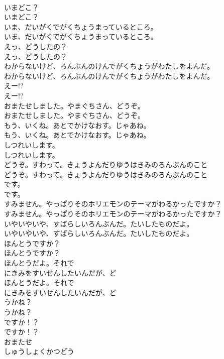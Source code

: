 \documentclass[8pt]{extreport}
\begin{document}
\begin{CJK}{UTF8}{min}
\\	いまどこ？
\\	いまどこ？
\\	いま、だいがくでがくちょうまっているところ。
\\	いま、だいがくでがくちょうまっているところ。
\\	えっ、どうしたの？
\\	えっ、どうしたの？
\\	わからないけど、ろんぶんのけんでがくちょうがわたしをよんだ。
\\	わからないけど、ろんぶんのけんでがくちょうがわたしをよんだ。
\\	えー!?
\\	えー!?
\\	おまたせしました。やまぐちさん、どうぞ。
\\	おまたせしました。やまぐちさん、どうぞ。
\\	もう、いくね。あとでかけなおす。じゃあね。
\\	もう、いくね。あとでかけなおす。じゃあね。
\\	しつれいします。
\\	しつれいします。
\\	どうぞ。すわって。きょうよんだりゆうはきみのろんぶんのこと
\\	どうぞ。すわって。きょうよんだりゆうはきみのろんぶんのこと
\\	です。
\\	です。
\\	すみません。やっぱりそのホリエモンのテーマがわるかったですか？
\\	すみません。やっぱりそのホリエモンのテーマがわるかったですか？
\\	いやいやいや、すばらしいろんぶんだ。たいしたものだよ。
\\	いやいやいや、すばらしいろんぶんだ。たいしたものだよ。
\\	ほんとうですか？
\\	ほんとうですか？
\\	ほんとうだよ。それで
\\	にきみをすいせんしたいんだが、ど
\\	ほんとうだよ。それで
\\	にきみをすいせんしたいんだが、ど
\\	うかね？
\\	うかね？
\\	ですか！？
\\	ですか！？
\\	おまたせ
\\	しゅうしょくかつどう

\end{CJK}
\end{document}
